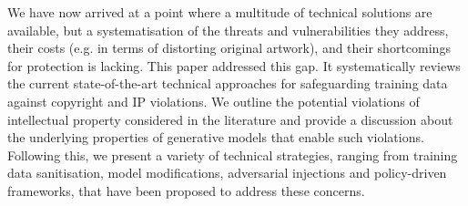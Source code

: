 \documentclass[conference]{IEEEtran}
\begin{document}
We have now arrived at a point where a multitude of technical solutions are available, but a systematisation of the threats and vulnerabilities they address, their costs (e.g. in terms of distorting original artwork), and their shortcomings for protection is lacking.
This paper addressed this gap. It systematically reviews the current state-of-the-art technical approaches for safeguarding training data against copyright and IP violations. 
We outline the potential violations of intellectual property considered in the literature and provide a discussion about the underlying properties of generative models that enable such violations. 
Following this, we present a variety of technical strategies, ranging from training data sanitisation, model modifications, adversarial injections and policy-driven frameworks, that have been proposed to address these concerns.  







\end{document}
